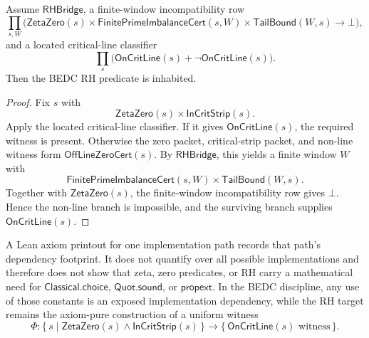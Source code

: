\begin{theorem}
\label{thm:rh-finite-imbalance-bridge-contradiction-route}
Assume $\mathsf{RHBridge}$, a finite-window incompatibility row
$$
\prod_{s,W}
\bigl(
\mathsf{ZetaZero}(s)
\times
\mathsf{FinitePrimeImbalanceCert}(s,W)
\times
\mathsf{TailBound}(W,s)
\to
\bot
\bigr),
$$
and a located critical-line classifier
$$
\prod_s
\bigl(
\mathsf{OnCritLine}(s)+\neg\mathsf{OnCritLine}(s)
\bigr).
$$
Then the BEDC RH predicate is inhabited.
\end{theorem}

\begin{proof}
Fix $s$ with
$$
\mathsf{ZetaZero}(s)\times\mathsf{InCritStrip}(s).
$$
Apply the located critical-line classifier. If it gives
$\mathsf{OnCritLine}(s)$, the required witness is present. Otherwise the
zero packet, critical-strip packet, and non-line witness form
$\mathsf{OffLineZeroCert}(s)$. By $\mathsf{RHBridge}$, this yields a finite
window $W$ with
$$
\mathsf{FinitePrimeImbalanceCert}(s,W)
\times
\mathsf{TailBound}(W,s).
$$
Together with $\mathsf{ZetaZero}(s)$, the finite-window incompatibility row
gives $\bot$. Hence the non-line branch is impossible, and the surviving
branch supplies $\mathsf{OnCritLine}(s)$.
\end{proof}

\begin{principle}
\label{prin:rh-axiom-footprint-not-necessity}
A Lean axiom printout for one implementation path records that path's
dependency footprint. It does not quantify over all possible
implementations and therefore does not show that zeta, zero predicates, or
RH carry a mathematical need for $\mathsf{Classical.choice}$,
$\mathsf{Quot.sound}$, or $\mathsf{propext}$. In the BEDC discipline, any
use of those constants is an exposed implementation dependency, while the
RH target remains the axiom-pure construction of a uniform witness
$$
\Phi:
\{\,s\mid\mathsf{ZetaZero}(s)\wedge\mathsf{InCritStrip}(s)\,\}
\to
\{\,\mathsf{OnCritLine}(s)\text{ witness}\,\}.
$$
\end{principle}

